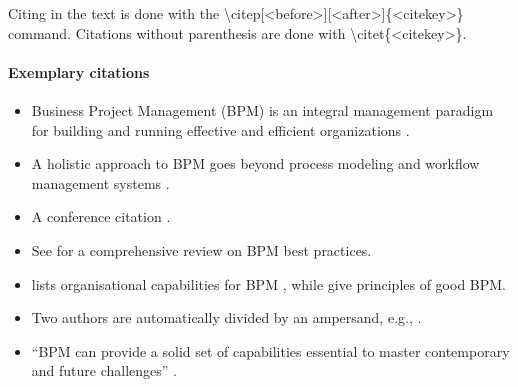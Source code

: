 Citing in the text is done with the \textbackslash citep[<before>][<after>]\{<citekey>\} command. Citations without parenthesis are done with \textbackslash citet\{<citekey>\}.

\paragraph{Exemplary citations}

\begin{itemize}
	\item Business Project Management (BPM) is an integral management paradigm for building and running effective and efficient organizations  \citep{Hammer2015, VomBrocke2014a}.
	\item A holistic approach to BPM goes beyond process modeling and workflow management systems \citep[p.{530}]{VomBrocke2014a}.
	\item A conference citation \citep{Rozinat2008}.
	\item See \citet{VomBrocke2014a} for a comprehensive review on BPM best practices.
	\item \citet{Hammer2015} lists organisational capabilities for BPM \citep[cf.][pf.{9}]{Hammer2015}, while \citet[cf.][pp.{530--546}]{VomBrocke2014a} give principles of good BPM.
	\item Two authors are automatically divided by an ampersand, e.g., \citep{Becker2011}.
	\item \enquote{BPM can provide a solid set of capabilities essential to master contemporary and future challenges} \citep[p.{534}]{VomBrocke2014a}.
\end{itemize}

